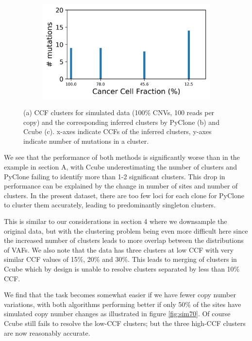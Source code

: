 \documentclass{article}
\begin{document}
\begin{figure}[h]
\begin{subfigure}[t]{0.32\linewidth}
		\subcaption{}	
	\end{subfigure}%
	\hspace{0.01 \linewidth}
	\begin{subfigure}[t]{0.32\linewidth}
		\centering
		\includegraphics[width = 1.0\linewidth, trim={0 0 0 0}, clip=true]{ccube_analysis_sim/cols.png}
		\subcaption{}
	\end{subfigure}%
\caption{(a) CCF clusters for simulated data (100\% CNVs, 100 reads per copy) and the corresponding inferred clusters by PyClone (b) and Ccube (c). x-axes indicate CCFs of the inferred clusters, y-axes indicate number of mutations in a cluster.}
\label{fig:sim}
\end{figure}

\newpage

We see that the performance of both methods is significantly worse than in the example in section A, with Ccube underestimating the number of clusters and PyClone failing to identify more than 1-2 significant clusters.
This drop in performance can be explained by the change in number of sites and number of clusters. In the present dataset, there are too few loci for each clone for PyClone to cluster them accurately, leading to predominantly singleton clusters.

This is similar to our considerations in section 4 where we downsample the original data, but with the clustering problem being even more difficult here since the increased number of clusters leads to more overlap between the distributions of VAFs.
We also note that the data has three clusters at low CCF with very similar CCF values of 15\%, 20\% and 30\%. This leads to merging of clusters in Ccube which by design is unable to resolve clusters separated by less than 10\% CCF.

We find that the task becomes somewhat easier if we have fewer copy number variations, with both algorithms performing better if only 50\% of the sites have simulated copy number changes as illustrated in figure \ref{fig:sim70}. Of course Ccube still fails to resolve the low-CCF clusters; but the three high-CCF clusters are now reasonably accurate.
\end{document}
